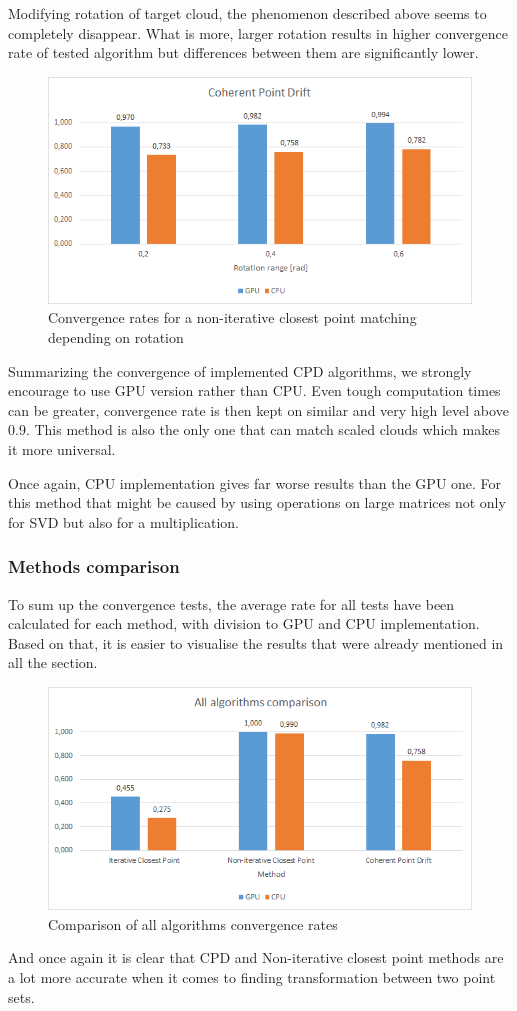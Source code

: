 \documentclass[titlepage]{article}
\begin{document}
Modifying rotation of target cloud, the phenomenon described above seems to completely disappear. What is more, larger rotation results in higher convergence rate of tested algorithm but differences between them are significantly lower.
\begin{figure}[H]
\includegraphics[width=\textwidth]{ss-cpd-3.png}
\caption{Convergence rates for a non-iterative closest point matching depending on rotation}
\end{figure}
Summarizing the convergence of implemented CPD algorithms, we strongly encourage to use GPU version rather than CPU. Even tough computation times can be greater, convergence rate is then kept on similar and very high level above 0.9. This method is also the only one that can match scaled clouds which makes it more universal. 

Once again, CPU implementation gives far worse results than the GPU one. For this method that might be caused by using operations on large matrices not only for SVD but also for a multiplication.

\subsubsection{Methods comparison}
To sum up the convergence tests, the average rate for all tests have been calculated for each method, with division to GPU and CPU implementation. Based on that, it is easier to visualise the results that were already mentioned in all the section. 
\begin{figure}[H]
\includegraphics[width=\textwidth]{ss-all.png}
\caption{Comparison of all algorithms convergence rates}
\end{figure}
And once again it is clear that CPD and Non-iterative closest point methods are a lot more accurate when it comes to finding transformation between two point sets.
\end{document}
